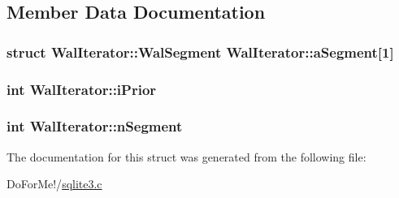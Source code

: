 \subsection{Member Data Documentation}
\hypertarget{struct_wal_iterator_a6d3fcaaeeca5a0eee46f9fa7c3cb669b}{
\subsubsection[{a\-Segment}]{\setlength{\rightskip}{0pt plus 5cm}struct {\bf Wal\-Iterator\-::\-Wal\-Segment}  Wal\-Iterator\-::a\-Segment\mbox{[}1\mbox{]}}}\label{struct_wal_iterator_a6d3fcaaeeca5a0eee46f9fa7c3cb669b}
\hypertarget{struct_wal_iterator_a2f906125490dd3e967fc53768b03abbb}{
\subsubsection[{i\-Prior}]{\setlength{\rightskip}{0pt plus 5cm}int Wal\-Iterator\-::i\-Prior}}\label{struct_wal_iterator_a2f906125490dd3e967fc53768b03abbb}
\hypertarget{struct_wal_iterator_ad81bc9447d6043212289d127dc9fdafa}{
\subsubsection[{n\-Segment}]{\setlength{\rightskip}{0pt plus 5cm}int Wal\-Iterator\-::n\-Segment}}\label{struct_wal_iterator_ad81bc9447d6043212289d127dc9fdafa}


The documentation for this struct was generated from the following file\-:\begin{DoxyCompactItemize}
\item 
Do\-For\-Me!/\hyperlink{sqlite3_8c}{sqlite3.\-c}\end{DoxyCompactItemize}
